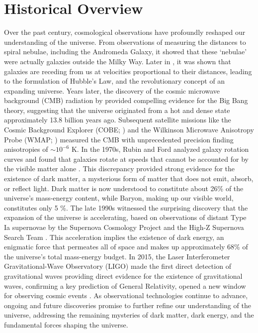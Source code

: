 \section{Historical Overview}
Over the past century, cosmological observations have profoundly reshaped our understanding of the universe. From observations of \citet{1925Obs....48..139H} measuring the distances to spiral nebulae, including the Andromeda Galaxy, it showed that these `nebulae' were actually galaxies outside the Milky Way. Later in \citet{1929ApJ....69..103H}, it was shown that galaxies are receding from us at velocities proportional to their distances, leading to the formulation of Hubble's Law, and the revolutionary concept of an expanding universe. Years later, the discovery of the cosmic microwave background (CMB) radiation by \citet{1965ApJ...142..419P} provided compelling evidence for the Big Bang theory, suggesting that the universe originated from a hot and dense state approximately 13.8 billion years ago. Subsequent satellite missions like the Cosmic Background Explorer (COBE; \citealt{1992ApJ...396L...1S}) and the Wilkinson Microwave Anisotropy Probe (WMAP; \citealt{2003ApJS..148...97B}) measured the CMB with unprecedented precision finding anisotropies of $\sim 10^{-6}$ K. In the 1970s, Rubin and Ford analyzed galaxy rotation curves and found that galaxies rotate at speeds that cannot be accounted for by the visible matter alone \citep{1970ApJ...159..379R, 1980ApJ...238..471R}. This discrepancy provided strong evidence for the existence of dark matter, a mysterious form of matter that does not emit, absorb, or reflect light. Dark matter is now understood to constitute about 26\% of the universe's mass-energy content, while Baryon, making up our visible world, constitutes only 5 \%. The late 1990s witnessed the surprising discovery that the expansion of the universe is accelerating, based on observations of distant Type Ia supernovae by the Supernova Cosmology Project and the High-Z Supernova Search Team \citep{1998AJ....116.1009R, 1999ApJ...517..565P}. This acceleration implies the existence of dark energy, an enigmatic force that permeates all of space and makes up approximately 68\% of the universe's total mass-energy budget. In 2015, the Laser Interferometer Gravitational-Wave Observatory (LIGO) made the first direct detection of gravitational waves providing direct evidence for the existence of gravitational waves, confirming a key prediction of General Relativity, opened a new window for observing cosmic events \citep{2016PhRvL.116f1102A}. As observational technologies continue to advance, ongoing and future discoveries promise to further refine our understanding of the universe, addressing the remaining mysteries of dark matter, dark energy, and the fundamental forces shaping the universe.

